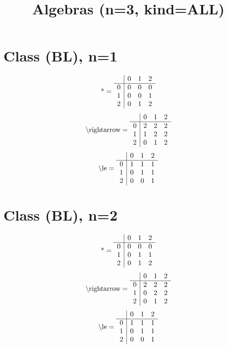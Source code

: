 \documentclass[11pt]{article}
\title{Algebras (n=3, kind=ALL)}
\date{}
\begin{document}
\maketitle
\tableofcontents
\section{Class (BL), n=1}
\[\text{*} = 
\begin{array}{r | r r r}
 & 0 & 1 & 2 \\ \hline
0 & 0 & 0 & 0 \\
1 & 0 & 0 & 1 \\
2 & 0 & 1 & 2 \\
\end{array}
\]
\[\text{\textbackslash rightarrow} = 
\begin{array}{r | r r r}
 & 0 & 1 & 2 \\ \hline
0 & 2 & 2 & 2 \\
1 & 1 & 2 & 2 \\
2 & 0 & 1 & 2 \\
\end{array}
\]
\[\text{\textbackslash le} = 
\begin{array}{r | r r r}
 & 0 & 1 & 2 \\ \hline
0 & 1 & 1 & 1 \\
1 & 0 & 1 & 1 \\
2 & 0 & 0 & 1 \\
\end{array}
\]

\section{Class (BL), n=2}
\[\text{*} = 
\begin{array}{r | r r r}
 & 0 & 1 & 2 \\ \hline
0 & 0 & 0 & 0 \\
1 & 0 & 1 & 1 \\
2 & 0 & 1 & 2 \\
\end{array}
\]
\[\text{\textbackslash rightarrow} = 
\begin{array}{r | r r r}
 & 0 & 1 & 2 \\ \hline
0 & 2 & 2 & 2 \\
1 & 0 & 2 & 2 \\
2 & 0 & 1 & 2 \\
\end{array}
\]
\[\text{\textbackslash le} = 
\begin{array}{r | r r r}
 & 0 & 1 & 2 \\ \hline
0 & 1 & 1 & 1 \\
1 & 0 & 1 & 1 \\
2 & 0 & 0 & 1 \\
\end{array}
\]
\end{document}
